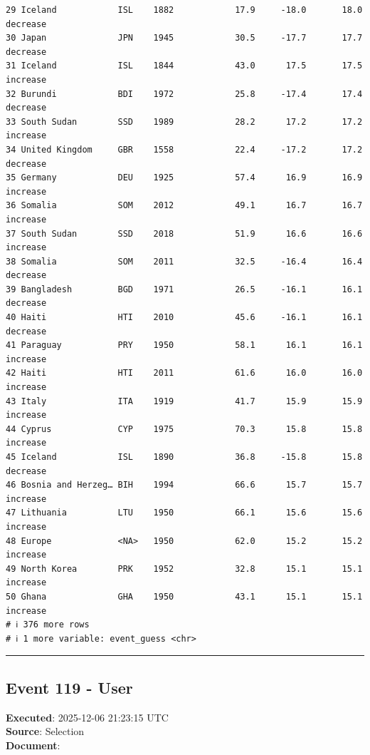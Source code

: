 \documentclass[
  11pt,
]{article}
\newenvironment{rpoutput}{\vspace{0.5em}\begin{snugshade}}{\end{snugshade}}
\begin{document}
\begin{rpoutput}
\begin{verbatim}
29 Iceland            ISL    1882            17.9     -18.0       18.0 decrease 
30 Japan              JPN    1945            30.5     -17.7       17.7 decrease 
31 Iceland            ISL    1844            43.0      17.5       17.5 increase 
32 Burundi            BDI    1972            25.8     -17.4       17.4 decrease 
33 South Sudan        SSD    1989            28.2      17.2       17.2 increase 
34 United Kingdom     GBR    1558            22.4     -17.2       17.2 decrease 
35 Germany            DEU    1925            57.4      16.9       16.9 increase 
36 Somalia            SOM    2012            49.1      16.7       16.7 increase 
37 South Sudan        SSD    2018            51.9      16.6       16.6 increase 
38 Somalia            SOM    2011            32.5     -16.4       16.4 decrease 
39 Bangladesh         BGD    1971            26.5     -16.1       16.1 decrease 
40 Haiti              HTI    2010            45.6     -16.1       16.1 decrease 
41 Paraguay           PRY    1950            58.1      16.1       16.1 increase 
42 Haiti              HTI    2011            61.6      16.0       16.0 increase 
43 Italy              ITA    1919            41.7      15.9       15.9 increase 
44 Cyprus             CYP    1975            70.3      15.8       15.8 increase 
45 Iceland            ISL    1890            36.8     -15.8       15.8 decrease 
46 Bosnia and Herzeg… BIH    1994            66.6      15.7       15.7 increase 
47 Lithuania          LTU    1950            66.1      15.6       15.6 increase 
48 Europe             <NA>   1950            62.0      15.2       15.2 increase 
49 North Korea        PRK    1952            32.8      15.1       15.1 increase 
50 Ghana              GHA    1950            43.1      15.1       15.1 increase 
# ℹ 376 more rows
# ℹ 1 more variable: event_guess <chr>
\end{verbatim}

\end{rpoutput}

\begin{center}\rule{0.5\linewidth}{0.5pt}\end{center}

\subsection{Event 119 - User}\label{event-119---user}

\textbf{Executed}: 2025-12-06 21:23:15 UTC\\
\textbf{Source}: Selection\\
\textbf{Document}:
\end{document}
